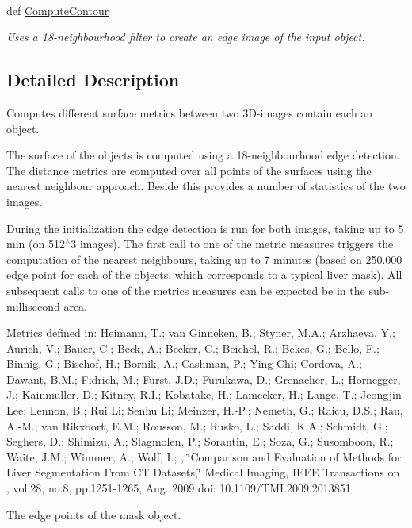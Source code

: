 \paragraph*{}
\begin{DoxyCompactItemize}
\item 
def \hyperlink{classmedpy_1_1metric_1_1Surface_1_1Surface_a7816a65c3be7f869e47a6094e456342e}{ComputeContour}
\begin{DoxyCompactList}\small\item\em Uses a 18-\/neighbourhood filter to create an edge image of the input object. \end{DoxyCompactList}\end{DoxyCompactItemize}



\subsection{Detailed Description}
Computes different surface metrics between two 3D-\/images contain each an object. 

The surface of the objects is computed using a 18-\/neighbourhood edge detection. The distance metrics are computed over all points of the surfaces using the nearest neighbour approach. Beside this provides a number of statistics of the two images.

During the initialization the edge detection is run for both images, taking up to 5 min (on 512$^\wedge$3 images). The first call to one of the metric measures triggers the computation of the nearest neighbours, taking up to 7 minutes (based on 250.000 edge point for each of the objects, which corresponds to a typical liver mask). All subsequent calls to one of the metrics measures can be expected be in the sub-\/millisecond area.

Metrics defined in: Heimann, T.; van Ginneken, B.; Styner, M.A.; Arzhaeva, Y.; Aurich, V.; Bauer, C.; Beck, A.; Becker, C.; Beichel, R.; Bekes, G.; Bello, F.; Binnig, G.; Bischof, H.; Bornik, A.; Cashman, P.; Ying Chi; Cordova, A.; Dawant, B.M.; Fidrich, M.; Furst, J.D.; Furukawa, D.; Grenacher, L.; Hornegger, J.; Kainmuller, D.; Kitney, R.I.; Kobatake, H.; Lamecker, H.; Lange, T.; Jeongjin Lee; Lennon, B.; Rui Li; Senhu Li; Meinzer, H.-\/P.; Nemeth, G.; Raicu, D.S.; Rau, A.-\/M.; van Rikxoort, E.M.; Rousson, M.; Rusko, L.; Saddi, K.A.; Schmidt, G.; Seghers, D.; Shimizu, A.; Slagmolen, P.; Sorantin, E.; Soza, G.; Susomboon, R.; Waite, J.M.; Wimmer, A.; Wolf, I.; , \char`\"{}Comparison and Evaluation of Methods for Liver Segmentation From CT Datasets,\char`\"{} Medical Imaging, IEEE Transactions on , vol.28, no.8, pp.1251-\/1265, Aug. 2009 doi: 10.1109/TMI.2009.2013851 \begin{DoxyVerb}The edge points of the mask object.\end{DoxyVerb}
 

